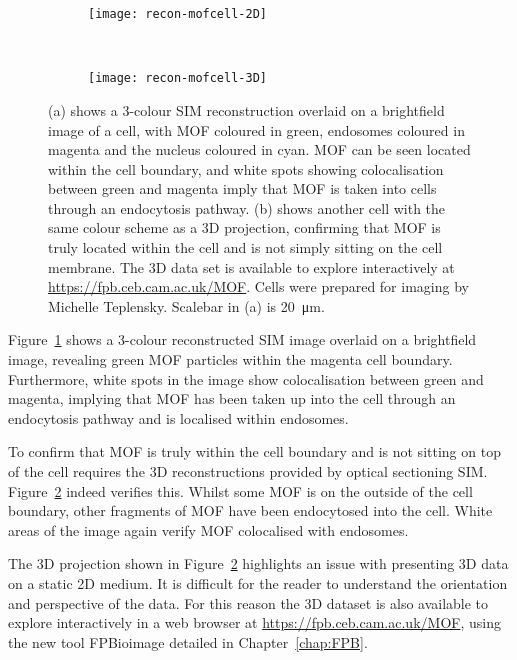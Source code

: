 \begin{figure}[tbp!]
\centering
\begin{subfigure}[b]{0.7\textwidth}
	\texttt{[image: recon-mofcell-2D]}
	\caption{}\label{fig:recon-mofcell-2D}
\end{subfigure}

~\newline
\begin{subfigure}[b]{0.7\textwidth}
	\texttt{[image: recon-mofcell-3D]}
	\caption{}\label{fig:recon-mofcell-3D}
\end{subfigure}
\caption[LAG SIM: 3D SIM reconstruction reveals that MOFs are endocytosed by HeLa cells]{(a) shows a 3-colour SIM reconstruction overlaid on a brightfield image of a cell, with MOF coloured in green, endosomes coloured in magenta and the nucleus coloured in cyan. MOF can be seen located within the cell boundary, and white spots showing colocalisation between green and magenta imply that MOF is taken into cells through an endocytosis pathway. (b) shows another cell with the same colour scheme as a 3D projection, confirming that MOF is truly located within the cell and is not simply sitting on the cell membrane. The 3D data set is available to explore interactively at \mbox{\url{https://fpb.ceb.cam.ac.uk/MOF}}. Cells were prepared for imaging by Michelle Teplensky. Scalebar in (a) is \SI{20}{\micro\metre}. }
\label{fig:recon-mofcell}
\end{figure}
\afterpage{\clearpage}

Figure~\ref{fig:recon-mofcell-2D} shows a 3-colour reconstructed SIM image overlaid on a brightfield image, revealing green MOF particles within the magenta cell boundary.
Furthermore, white spots in the image show colocalisation between green and magenta, implying that MOF has been taken up into the cell through an endocytosis pathway and is localised within endosomes.

To confirm that MOF is truly within the cell boundary and is not sitting on top of the cell requires the 3D reconstructions provided by optical sectioning SIM.
Figure~\ref{fig:recon-mofcell-3D} indeed verifies this.
Whilst some MOF is on the outside of the cell boundary, other fragments of MOF have been endocytosed into the cell.
White areas of the image again verify MOF colocalised with endosomes.

The 3D projection shown in Figure~\ref{fig:recon-mofcell-3D} highlights an issue with presenting 3D data on a static 2D medium.
It is difficult for the reader to understand the orientation and perspective of the data.
For this reason the 3D dataset is also available to explore interactively in a web browser at \url{https://fpb.ceb.cam.ac.uk/MOF}, using the new tool FPBioimage detailed in Chapter~\ref{chap:FPB}.

